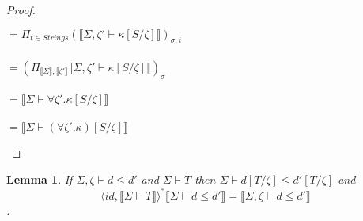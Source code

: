 \documentclass{article}
\newtheorem{lemma}{Lemma}
\newcommand{\sem}[1]{\llbracket #1 \rrbracket}
\begin{document}
\begin{proof}
\begin{description}
$= \Pi_{t \in \mathit{Strings}} (\sem{\Sigma,\zeta' \vdash \kappa[S/\zeta]})_{\sigma,t}$\\~\\
$= (\Pi_{\sem{\Sigma},\sem{\zeta'}} \sem{\Sigma,\zeta' \vdash \kappa[S/\zeta]})_\sigma$\\~\\
$= \sem{\Sigma \vdash \forall \zeta'. \kappa[S/\zeta]}$\\~\\
$= \sem{\Sigma \vdash (\forall \zeta'. \kappa)[S/\zeta]}$
\end{description}
\end{proof}

\begin{lemma}
If $\Sigma,\zeta \vdash d \leq d'$ and $\Sigma \vdash T$ then $\Sigma \vdash d[T/\zeta] \leq d'[T/\zeta]$ and 
$$\langle \mathit{id}, \sem{\Sigma \vdash T} \rangle^* \sem{\Sigma \vdash d \leq d'} = \sem{\Sigma,\zeta \vdash d \leq d'}$$.
\label{SD-Subst}
\end{lemma}
\end{document}
